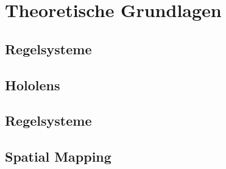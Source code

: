 \chapter{Theoretische Grundlagen}

\section{Regelsysteme}

\section{Hololens}

\section{Regelsysteme}

\section{Spatial Mapping}
